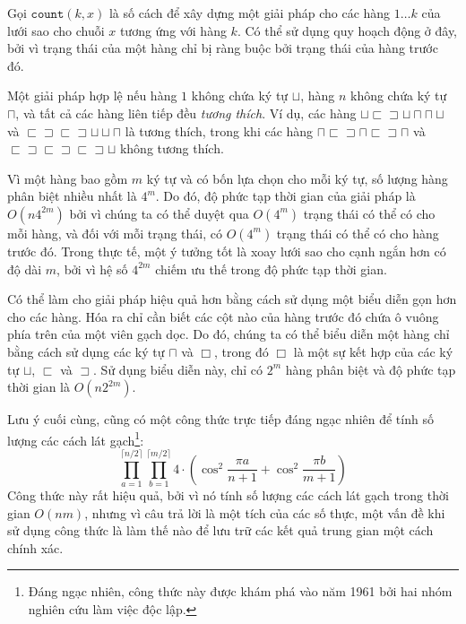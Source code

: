 Gọi $\texttt{count}(k,x)$ là số cách để
xây dựng một giải pháp cho các hàng $1 \ldots k$
của lưới sao cho chuỗi $x$ tương ứng với hàng $k$.
Có thể sử dụng quy hoạch động ở đây,
bởi vì trạng thái của một hàng chỉ bị ràng buộc
bởi trạng thái của hàng trước đó.

Một giải pháp hợp lệ nếu hàng $1$ không chứa
ký tự $\sqcup$,
hàng $n$ không chứa ký tự $\sqcap$,
và tất cả các hàng liên tiếp đều \emph{tương thích}.
Ví dụ, các hàng
$\sqcup \sqsubset \sqsupset \sqcup \sqcap \sqcap \sqcup$ và
$\sqsubset \sqsupset \sqsubset \sqsupset \sqcup \sqcup \sqcap$ 
là tương thích, trong khi các hàng
$\sqcap \sqsubset \sqsupset \sqcap \sqsubset \sqsupset \sqcap$ và
$\sqsubset \sqsupset \sqsubset \sqsupset \sqsubset \sqsupset \sqcup$
không tương thích.

Vì một hàng bao gồm $m$ ký tự và có
bốn lựa chọn cho mỗi ký tự, số lượng
hàng phân biệt nhiều nhất là $4^m$.
Do đó, độ phức tạp thời gian của giải pháp là
$O(n 4^{2m})$ bởi vì chúng ta có thể duyệt qua
$O(4^m)$ trạng thái có thể có cho mỗi hàng,
và đối với mỗi trạng thái, có $O(4^m)$
trạng thái có thể có cho hàng trước đó.
Trong thực tế, một ý tưởng tốt là xoay lưới
sao cho cạnh ngắn hơn có độ dài $m$,
bởi vì hệ số $4^{2m}$ chiếm ưu thế trong độ phức tạp thời gian.

Có thể làm cho giải pháp hiệu quả hơn
bằng cách sử dụng một biểu diễn gọn hơn cho các hàng.
Hóa ra chỉ cần biết
các cột nào của hàng trước đó chứa
ô vuông phía trên của một viên gạch dọc.
Do đó, chúng ta có thể biểu diễn một hàng chỉ bằng cách sử dụng các ký tự
$\sqcap$ và $\Box$, trong đó $\Box$ là một sự kết hợp
của các ký tự
$\sqcup$, $\sqsubset$ và $\sqsupset$.
Sử dụng biểu diễn này, chỉ có
$2^m$ hàng phân biệt và độ phức tạp thời gian là
$O(n 2^{2m})$.

Lưu ý cuối cùng, cũng có một công thức trực tiếp đáng ngạc nhiên
để tính số lượng các cách lát gạch\footnote{Đáng ngạc nhiên,
công thức này được khám phá vào năm 1961 bởi hai nhóm nghiên cứu \cite{kas61,tem61}
làm việc độc lập.}:
\[ \prod_{a=1}^{\lceil n/2 \rceil} \prod_{b=1}^{\lceil m/2 \rceil} 4 \cdot (\cos^2 \frac{\pi a}{n + 1} + \cos^2 \frac{\pi b}{m+1})\]
Công thức này rất hiệu quả, bởi vì nó tính
số lượng các cách lát gạch trong thời gian $O(nm)$,
nhưng vì câu trả lời là một tích của các số thực,
một vấn đề khi sử dụng công thức là
làm thế nào để lưu trữ các kết quả trung gian một cách chính xác.